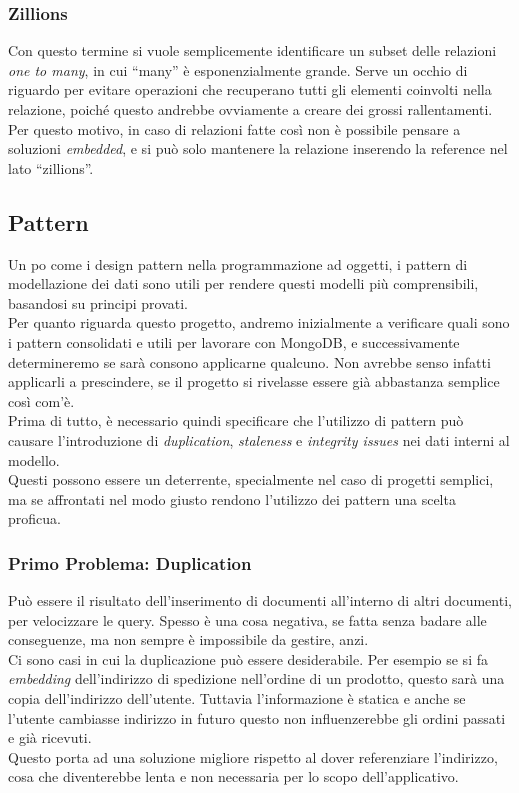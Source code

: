 \subsubsection{Zillions}
Con questo termine si vuole semplicemente identificare un subset delle relazioni \textit{one to many}, in cui ``many'' è esponenzialmente grande. Serve un occhio di riguardo per evitare operazioni che recuperano tutti gli elementi coinvolti nella relazione, poiché questo andrebbe ovviamente a creare dei grossi rallentamenti.
Per questo motivo, in caso di relazioni fatte così non è possibile pensare a soluzioni \textit{embedded}, e si può solo mantenere la relazione inserendo la reference nel lato ``zillions''.

\subsection{Pattern}
Un po come i \gls{design pattern} nella programmazione ad oggetti, i pattern di modellazione dei dati sono utili per rendere questi modelli più comprensibili, basandosi su principi provati.\\
Per quanto riguarda questo progetto, andremo inizialmente a verificare quali sono i pattern consolidati e utili per lavorare con MongoDB, e successivamente determineremo se sarà consono applicarne qualcuno. Non avrebbe senso infatti applicarli a prescindere, se il progetto si rivelasse essere già abbastanza semplice così com'è.\\

\noindent Prima di tutto, è necessario quindi specificare che l'utilizzo di pattern può causare l'introduzione di \textit{duplication}, \textit{staleness} e \textit{integrity issues} nei dati interni al modello.\\
Questi possono essere un deterrente, specialmente nel caso di progetti semplici, ma se affrontati nel modo giusto rendono l'utilizzo dei pattern una scelta proficua.\\

\subsubsection{Primo Problema: Duplication}
Può essere il risultato dell'inserimento di documenti all'interno di altri documenti, per velocizzare le query. Spesso è una cosa negativa, se fatta senza badare alle conseguenze, ma non sempre è impossibile da gestire, anzi.\\

\noindent Ci sono casi in cui la duplicazione può essere desiderabile. Per esempio se si fa \textit{embedding} dell'indirizzo di spedizione nell'ordine di un prodotto, questo sarà una copia dell'indirizzo dell'utente. Tuttavia l'informazione è statica e anche se l'utente cambiasse indirizzo in futuro questo non influenzerebbe gli ordini passati e già ricevuti.\\
Questo porta ad una soluzione migliore rispetto al dover referenziare l'indirizzo, cosa che diventerebbe lenta e non necessaria per lo scopo dell'applicativo.\\

